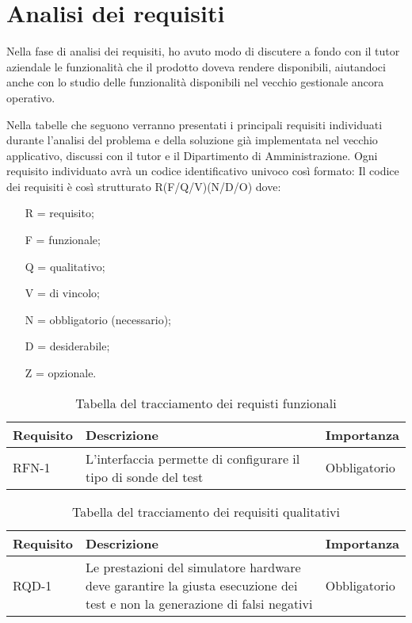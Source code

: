 \section{Analisi dei requisiti}
Nella fase di analisi dei requisiti, ho avuto modo di discutere a fondo con il tutor
aziendale le funzionalità che il prodotto doveva rendere disponibili, aiutandoci anche con lo studio delle funzionalità disponibili nel vecchio gestionale ancora operativo.

Nella tabelle che seguono verranno presentati i principali requisiti individuati
durante l’analisi del problema e della soluzione già implementata nel vecchio applicativo, discussi con il tutor e il Dipartimento di Amministrazione.
Ogni requisito individuato avrà un codice identiﬁcativo univoco così formato:
Il codice dei requisiti è così strutturato R(F/Q/V)(N/D/O) dove:
\begin{enumerate}
	\item[R =] requisito;
    \item[F =] funzionale;
    \item[Q =] qualitativo;
    \item[V =] di vincolo;
    \item[N =] obbligatorio (necessario);
    \item[D =] desiderabile;
    \item[Z =] opzionale.
\end{enumerate}

\newpage

\begin{table}%
\caption{Tabella del tracciamento dei requisti funzionali}
\label{tab:requisiti-funzionali}
\begin{tabularx}{\textwidth}{lXl}
\hline\hline
\textbf{Requisito} & \textbf{Descrizione} & \textbf{Importanza}\\
\hline
RFN-1     & L'interfaccia permette di configurare il tipo di sonde del test & Obbligatorio \\
\hline
\end{tabularx}
\end{table}%

\begin{table}%
\caption{Tabella del tracciamento dei requisiti qualitativi}
\label{tab:requisiti-qualitativi}
\begin{tabularx}{\textwidth}{lXl}
\hline\hline
\textbf{Requisito} & \textbf{Descrizione} & \textbf{Importanza}\\
\hline
RQD-1    & Le prestazioni del simulatore hardware deve garantire la giusta esecuzione dei test e non la generazione di falsi negativi & Obbligatorio \\
\hline
\end{tabularx}
\end{table}%


